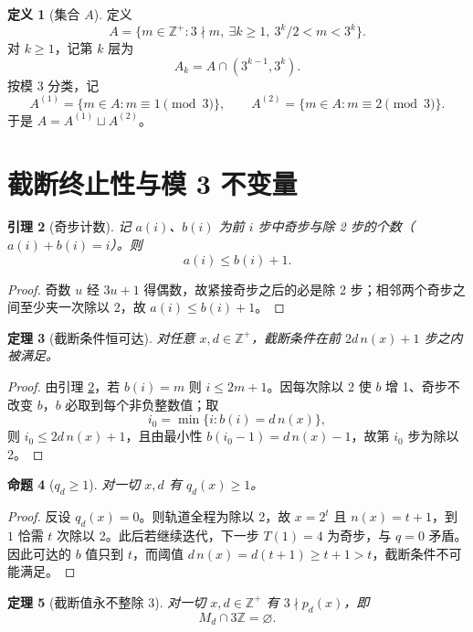 \documentclass[11pt]{article}
\newtheorem{theorem}{定理}[section]
\newtheorem{lemma}[theorem]{引理}
\newtheorem{proposition}[theorem]{命题}
\theoremstyle{definition}
\newtheorem{definition}[theorem]{定义}
\theoremstyle{definition}
\theoremstyle{remark}
\begin{document}
\begin{definition}[集合 \(A\)]\label{def:A}
定义
\[
A=\{m\in\mathbb Z^+:3\nmid m,\ \exists k\ge1,\ 3^k/2<m<3^k\}.
\]
对 \(k\ge1\)，记第 \(k\) 层为
\[
A_k=A\cap(3^{k-1},3^k).
\]
按模 3 分类，记
\[
A^{(1)}=\{m\in A:m\equiv1\pmod3\},\qquad
A^{(2)}=\{m\in A:m\equiv2\pmod3\}.
\]
于是 \(A=A^{(1)}\sqcup A^{(2)}\)。
\end{definition}

\section{截断终止性与模 3 不变量}

\begin{lemma}[奇步计数]\label{lem:ab}
记 \(a(i)\)、\(b(i)\) 为前 \(i\) 步中奇步与除 2 步的个数（\(a(i)+b(i)=i\)）。则
\[
a(i)\le b(i)+1.
\]
\end{lemma}

\begin{proof}
奇数 \(u\) 经 \(3u+1\) 得偶数，故紧接奇步之后的必是除 2 步；相邻两个奇步之间至少夹一次除以 2，故 \(a(i)\le b(i)+1\)。
\end{proof}

\begin{theorem}[截断条件恒可达]\label{thm:term}
对任意 \(x,d\in\mathbb Z^+\)，截断条件在前 \(2d\,n(x)+1\) 步之内被满足。
\end{theorem}

\begin{proof}
由引理 \ref{lem:ab}，若 \(b(i)=m\) 则 \(i\le2m+1\)。因每次除以 2 使 \(b\) 增 1、奇步不改变 \(b\)，\(b\) 必取到每个非负整数值；取
\[
i_0=\min\{i:b(i)=d\,n(x)\},
\]
则 \(i_0\le2d\,n(x)+1\)，且由最小性 \(b(i_0-1)=d\,n(x)-1\)，故第 \(i_0\) 步为除以 2。
\end{proof}

\begin{proposition}[\(q_d\ge1\)]\label{prop:qge}
对一切 \(x,d\) 有 \(q_d(x)\ge1\)。
\end{proposition}

\begin{proof}
反设 \(q_d(x)=0\)。则轨道全程为除以 2，故 \(x=2^t\) 且 \(n(x)=t+1\)，到 \(1\) 恰需 \(t\) 次除以 2。此后若继续迭代，下一步 \(T(1)=4\) 为奇步，与 \(q=0\) 矛盾。因此可达的 \(b\) 值只到 \(t\)，而阈值 \(d\,n(x)=d(t+1)\ge t+1>t\)，截断条件不可能满足。
\end{proof}

\begin{theorem}[截断值永不整除 3]\label{thm:mod3}
对一切 \(x,d\in\mathbb Z^+\) 有 \(3\nmid p_d(x)\)，即
\[
M_d\cap3\mathbb Z=\varnothing.
\]
\end{theorem}
\end{document}
